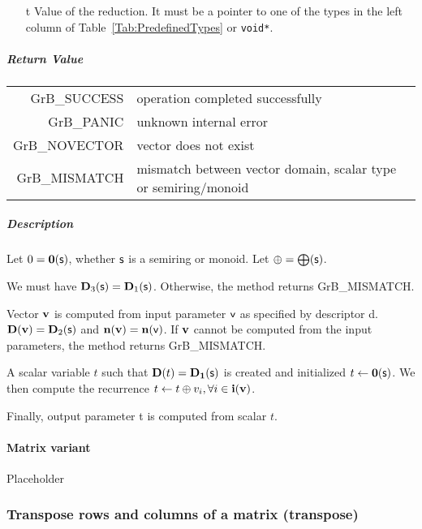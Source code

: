 \begin{itemize}
	\item[{\sf t}] Value of the reduction. It must
	be a pointer to one of the types in 
	the left column of Table~\ref{Tab:PredefinedTypes} or
	{\tt void*}.
\end{itemize}

\subparagraph{Return Value}

\begin{tabular}{rl}
{\sf GrB\_SUCCESS}	& operation completed successfully \\
{\sf GrB\_PANIC}	& unknown internal error \\
{\sf GrB\_NOVECTOR}	& vector does not exist \\
{\sf GrB\_MISMATCH}	& mismatch between vector domain, scalar type or semiring/monoid \\
\end{tabular}

\subparagraph{Description}

Let $0 = \bold{0}({\sf s})$, whether ${\sf s}$ is a semiring or monoid.
Let $\oplus = \bigoplus({\sf s})$.

We must have $\bold{D}_3({\sf s}) = \bold{D}_1({\sf s})$.
Otherwise, the method returns {\sf GrB\_MISMATCH}.

Vector ${\bf v}$ is computed from input parameter ${\sf v}$ as
specified by descriptor {\sf d}. $\bold{D}({\bf v}) = \bold{D}_2({\sf s})$
and $\bold{n}({\bf v}) = \bold{n}({\sf v})$. If ${\bf v}$ cannot be computed
from the input parameters, the method returns {\sf GrB\_MISMATCH}.

A scalar variable $t$ such that $\bold{D}(t) = \bold{D_1}({\sf s})$ is
created and initialized $t \leftarrow \bold{0}({\sf s})$. 
We then compute the recurrence $t \leftarrow t \oplus v_i, \forall i \in {\bf i}({\bf v})$.

Finally, output parameter {\sf t} is computed from scalar $t$.



\paragraph{Matrix variant}

Placeholder



\subsubsection{Transpose rows and columns of a matrix ({\sf transpose})}

